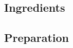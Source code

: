 \documentclass[fontsize=15pt,paper=a4]{scrdoc}
\begin{document}
\section*{}
\vspace{-15pt}
\subsection*{Ingredients}
\begin{multicols}{2}
    \begin{itemize}[left=0pt, label={-}, itemsep=-0.15em]
        
    \end{itemize}
\end{multicols}
\subsection*{Preparation}
\begin{enumerate}[left=0pt]
    
\end{enumerate}
\end{document}
